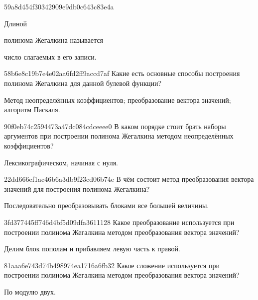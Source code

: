 \begin{note}{59a8d454f30342909e9db0c643c83e4a}
    \begin{icloze}{2}Длиной\end{icloze} полинома Жегалкина называется \begin{icloze}{1}число слагаемых в его записи.\end{icloze}
\end{note}

\begin{note}{58b6e8c19b7e4e02aa6fd2ff9accd7af}
    Какие есть основные способы построения полинома Жегалкина для данной булевой функции?

    \begin{cloze}{1}
        Метод неопределённых коэффициентов; преобразование вектора значений; алгоритм Паскаля.
    \end{cloze}
\end{note}

\begin{note}{90f0eb74c2594473a47dc084cdceeee0}
    В каком порядке стоит брать наборы аргументов при построении полинома Жегалкина методом неопределённых коэффициентов?

    \begin{cloze}{1}
        Лексикографическом, начиная с нуля.
    \end{cloze}
\end{note}

\begin{note}{22dd666ef1ac46b6a3db9f23cd06b74e}
    В чём состоит метод преобразования вектора значений для построения полинома Жегалкина?

    \begin{cloze}{1}
        Последовательно преобразовывать блоками все большей величины.
    \end{cloze}
\end{note}

\begin{note}{3fd377445ff746d4bf5d09dfa3611128}
    Какое преобразование используется при построении полинома Жегалкина методом преобразования вектора значений?

    \begin{cloze}{1}
        Делим блок пополам и прибавляем левую часть к правой.
    \end{cloze}
\end{note}

\begin{note}{81aaa6e743d74b498974ea1716a6fb32}
    Какое сложение используется при построении полинома Жегалкина методом преобразования вектора значений?

    \begin{cloze}{1}
        По модулю двух.
    \end{cloze}
\end{note}

